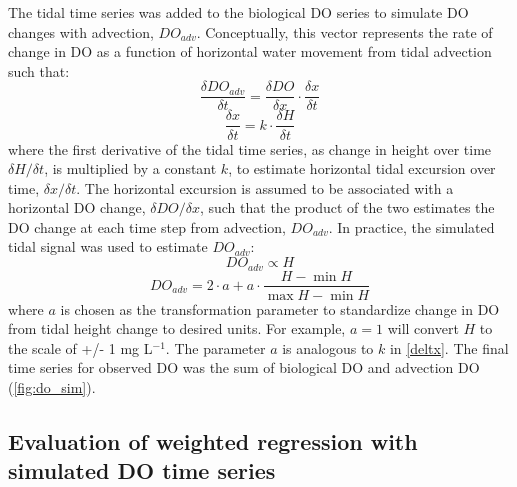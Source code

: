 \documentclass[letterpaper,12pt,oneside]{article}\usepackage[]{graphicx}\usepackage[]{color}
\begin{document}
The tidal time series was added to the biological \ac{DO} series to simulate \ac{DO} changes with advection, $DO_{adv}$. Conceptually, this vector represents the rate of change in \ac{DO} as a function of horizontal water movement from tidal advection such that:
\begin{equation} \label{deltdo}
\frac{\delta DO_{adv}}{\delta t} = \frac{\delta DO}{\delta x} \cdot \frac{\delta x}{\delta t}
\end{equation}
\begin{equation} \label{deltx}
\frac{\delta x}{\delta t} = k \cdot \frac{\delta H}{\delta t}
\end{equation}
where the first derivative of the tidal time series, as change in height over time $\delta H / \delta t$, is multiplied by a constant $k$, to estimate horizontal tidal excursion over time, $\delta x / \delta t$.  The horizontal excursion is assumed to be associated with a horizontal \ac{DO} change, $\delta DO / \delta x$, such that the product of the two estimates the \ac{DO} change at each time step from advection, $DO_{adv}$. In practice, the simulated tidal signal was used to estimate $DO_{adv}$:
\begin{equation} \label{do_advp}
DO_{adv} \propto H
\end{equation}
\begin{equation} \label{do_adv}
DO_{adv} = 2\cdot a + a \cdot \frac{H- \min H}{\max H - \min H}
\end{equation}
where $a$ is chosen as the transformation parameter to standardize change in \ac{DO} from tidal height change to desired units.  For example, $a = 1$ will convert $H$ to the scale of +/- 1 mg L$^{-1}$.  The parameter $a$ is analogous to $k$ in \cref{deltx}. The final time series for observed \ac{DO} was the sum of biological \ac{DO} and advection \ac{DO} (\cref{fig:do_sim}).

\subsection{Evaluation of weighted regression with simulated \ac{DO} time series}
\end{document}
